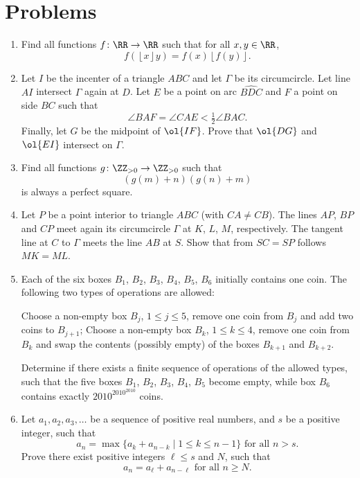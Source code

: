 \documentclass[11pt]{scrartcl}
\begin{document}
\section{Problems}
\begin{enumerate}[\bfseries 1.]
\item %
Find all functions $f \colon \RR \to \RR$
such that for all $x,y \in \RR$,
\[ f(\left\lfloor x\right\rfloor y)
  = f(x)\left\lfloor f(y)\right\rfloor. \]

\item %
Let $I$ be the incenter of a triangle $ABC$ and let $\Gamma$ be its circumcircle.
Let line $AI$ intersect $\Gamma$ again at $D$.
Let $E$ be a point on arc $\widehat{BDC}$ and $F$ a point on side $BC$ such that
\[ \angle BAF = \angle CAE < \tfrac12 \angle BAC. \]
Finally, let $G$ be the midpoint of $\ol{IF}$.
Prove that $\ol{DG}$ and $\ol{EI}$ intersect on $\Gamma$.

\item %
Find all functions $g \colon \ZZ_{>0} \to \ZZ_{>0}$ such that
\[ \left( g(m)+n \right)\left( g(n)+m \right) \]
is always a perfect square.

\item %
Let $P$ be a point interior to triangle $ABC$ (with $CA \neq CB$).
The lines $AP$, $BP$ and $CP$ meet again its circumcircle $\Gamma$
at $K$, $L$, $M$, respectively.
The tangent line at $C$ to $\Gamma$ meets the line $AB$ at $S$.
Show that from $SC = SP$ follows $MK = ML$.

\item %
Each of the six boxes $B_1$, $B_2$, $B_3$, $B_4$, $B_5$, $B_6$
initially contains one coin.
The following two types of operations are allowed:
\begin{enumerate}
  \ii Choose a non-empty box $B_j$, $1\leq j \leq 5$,
  remove one coin from $B_j$ and add two coins to $B_{j+1}$;
  \ii Choose a non-empty box $B_k$, $1\leq k \leq 4$,
  remove one coin from $B_k$ and swap the contents
  (possibly empty) of the boxes $B_{k+1}$ and $B_{k+2}$.
\end{enumerate}
Determine if there exists a finite sequence of operations of the allowed types,
such that the five boxes $B_1$, $B_2$, $B_3$, $B_4$, $B_5$ become empty,
while box $B_6$ contains exactly $2010^{2010^{2010}}$ coins.

\item %
Let $a_1, a_2, a_3, \dots$ be a sequence of positive real numbers, and $s$ be a positive integer, such that
\[
  a_n =
  \max \{ a_k + a_{n-k} \mid 1 \leq k \leq n-1 \}
  \text{ for all $n > s$}.
\]
Prove there exist positive integers $\ell \leq s$ and $N$, such that
\[
  a_n =
  a_{\ell} + a_{n - \ell} \text{ for all $n \ge N$}.
\]

\end{enumerate}
\pagebreak
\end{document}
